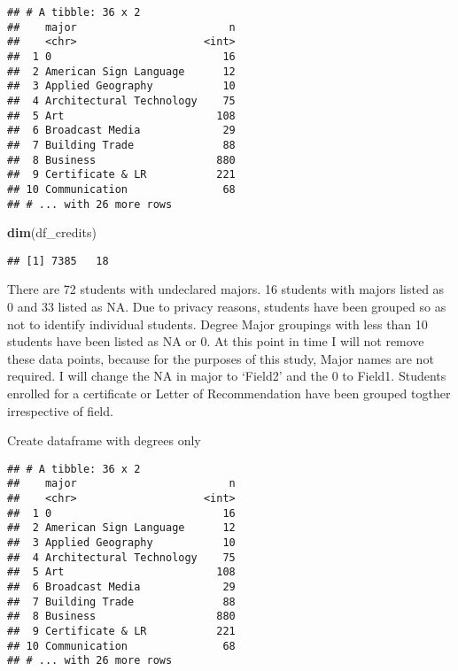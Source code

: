 \documentclass[]{article}
\newenvironment{Shaded}{\begin{snugshade}}{\end{snugshade}}
\newcommand{\CommentTok}[1]{\textcolor[rgb]{0.56,0.35,0.01}{\textit{#1}}}
\newcommand{\KeywordTok}[1]{\textcolor[rgb]{0.13,0.29,0.53}{\textbf{#1}}}
\newcommand{\NormalTok}[1]{#1}
\newcommand{\OperatorTok}[1]{\textcolor[rgb]{0.81,0.36,0.00}{\textbf{#1}}}
\newcommand{\StringTok}[1]{\textcolor[rgb]{0.31,0.60,0.02}{#1}}
\begin{document}
\begin{verbatim}
## # A tibble: 36 x 2
##    major                        n
##    <chr>                    <int>
##  1 0                           16
##  2 American Sign Language      12
##  3 Applied Geography           10
##  4 Architectural Technology    75
##  5 Art                        108
##  6 Broadcast Media             29
##  7 Building Trade              88
##  8 Business                   880
##  9 Certificate & LR           221
## 10 Communication               68
## # ... with 26 more rows
\end{verbatim}

\begin{Shaded}
\begin{Highlighting}[]
\KeywordTok{dim}\NormalTok{(df_credits)}
\end{Highlighting}
\end{Shaded}

\begin{verbatim}
## [1] 7385   18
\end{verbatim}

There are 72 students with undeclared majors. 16 students with majors
listed as 0 and 33 listed as NA. Due to privacy reasons, students have
been grouped so as not to identify individual students. Degree Major
groupings with less than 10 students have been listed as NA or 0. At
this point in time I will not remove these data points, because for the
purposes of this study, Major names are not required. I will change the
NA in major to `Field2' and the 0 to Field1. Students enrolled for a
certificate or Letter of Recommendation have been grouped togther
irrespective of field.

Create dataframe with degrees only

\begin{Shaded}
\end{Shaded}

\begin{verbatim}
## # A tibble: 36 x 2
##    major                        n
##    <chr>                    <int>
##  1 0                           16
##  2 American Sign Language      12
##  3 Applied Geography           10
##  4 Architectural Technology    75
##  5 Art                        108
##  6 Broadcast Media             29
##  7 Building Trade              88
##  8 Business                   880
##  9 Certificate & LR           221
## 10 Communication               68
## # ... with 26 more rows
\end{verbatim}
\end{document}
